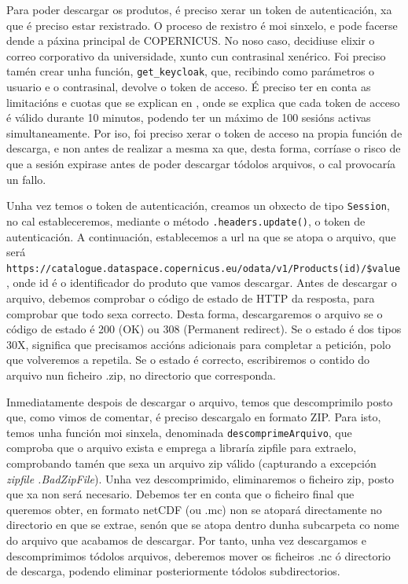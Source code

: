 Para poder descargar os produtos, é preciso xerar un token de autenticación, xa que é preciso estar rexistrado. O proceso de rexistro é moi sinxelo, e pode facerse dende a páxina principal de
COPERNICUS. No noso caso, decidiuse elixir o correo corporativo da universidade, xunto cun contrasinal xenérico. Foi preciso tamén crear unha función, \texttt{get\_keycloak}, que, recibindo como
parámetros o usuario e o contrasinal, devolve o token de acceso. É preciso ter en conta as limitacións e cuotas que se explican en \cite{copquotas}, onde se explica que cada token de acceso é válido
durante 10 minutos, podendo ter un máximo de 100 sesións activas simultaneamente. Por iso, foi preciso xerar o token de acceso na propia función de descarga, e non antes de realizar a mesma xa que,
desta forma, corríase o risco de que a sesión expirase antes de poder descargar tódolos arquivos, o cal provocaría un fallo.

Unha vez temos o token de autenticación, creamos un obxecto de tipo \texttt{Session}, no cal estableceremos, mediante o método \texttt{.headers.update()}, o token de autenticación. A continuación,
establecemos a url na que se atopa o arquivo, que será \texttt{https://catalogue.dataspace.copernicus.eu/odata/v1/Products({id})\break/\$value}, onde id é o identificador do produto que vamos
descargar. Antes de descargar o arquivo, debemos comprobar o código de estado de HTTP da resposta, para comprobar que todo sexa correcto. Desta forma, descargaremos o arquivo se o código de estado
é 200 (OK) ou 308 (Permanent redirect). Se o estado é dos tipos 30X, significa que precisamos accións adicionais para completar a petición, polo que volveremos a repetila. Se o estado é correcto,
escribiremos o contido do arquivo nun ficheiro .zip, no directorio que corresponda.

Inmediatamente despois de descargar o arquivo, temos que descomprimilo posto que, como vimos de comentar, é preciso descargalo en formato ZIP. Para isto, temos unha función moi sinxela, denominada
\texttt{descomprimeArquivo}, que comproba que o arquivo exista e emprega a libraría zipfile para extraelo, comprobando tamén que sexa un arquivo zip válido (capturando a excepción \textit{zipfile
.BadZipFile}). Unha vez descomprimido, eliminaremos o ficheiro zip, posto que xa non será necesario. Debemos ter en conta que o ficheiro final que queremos obter, en formato netCDF (ou .mc) non se
atopará directamente no directorio en que se extrae, senón que se atopa dentro dunha subcarpeta co nome do arquivo que acabamos de descargar. Por tanto, unha vez descargamos e descomprimimos
tódolos arquivos, deberemos mover os ficheiros .nc ó directorio de descarga, podendo eliminar posteriormente tódolos subdirectorios.


